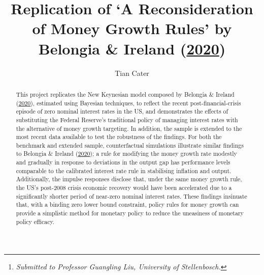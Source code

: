 \documentclass[11pt,preprint, authoryear]{elsarticle}
\numberwithin{equation}{section}
\numberwithin{figure}{section}
\numberwithin{table}{section}
\let\rmarkdownfootnote\footnote%
\def\footnote{\protect\rmarkdownfootnote}
\begin{document}
\begin{frontmatter}  %

\title{Replication of `A Reconsideration of Money Growth Rules' by
Belongia \& Ireland (\protect\hyperlink{ref-belongia2020}{2020})}





\author[Add1]{Tian Cater}





\address[Add1]{Advanced time series 2022 Part III project: Baysian
analysis of DSGE models\footnote{\emph{Submitted to Professor Guangling
  Liu, University of Stellenbosch.}}}
\address[Add2]{January 2023}


\begin{abstract}
\small{
This project replicates the New Keynesian model composed by Belongia \&
Ireland (\protect\hyperlink{ref-belongia2020}{2020}), estimated using
Bayesian techniques, to reflect the recent post-financial-crisis episode
of zero nominal interest rates in the US, and demonstrates the effects
of substituting the Federal Reserve's traditional policy of managing
interest rates with the alternative of money growth targeting. In
addition, the sample is extended to the most recent data available to
test the robustness of the findings. For both the benchmark and extended
sample, counterfactual simulations illustrate similar findings to
Belongia \& Ireland (\protect\hyperlink{ref-belongia2020}{2020}); a rule
for modifying the money growth rate modestly and gradually in response
to deviations in the output gap has performance levels comparable to the
calibrated interest rate rule in stabilising inflation and output.
Additionally, the impulse responses disclose that, under the same money
growth rule, the US's post-2008 crisis economic recovery would have been
accelerated due to a significantly shorter period of near-zero nominal
interest rates. These findings insinuate that, with a binding zero lower
bound constraint, policy rules for money growth can provide a simplistic
method for monetary policy to reduce the uneasiness of monetary policy
efficacy.
}
\end{abstract}

\vspace{1cm}





\vspace{0.5cm}

\end{frontmatter}
\end{document}
